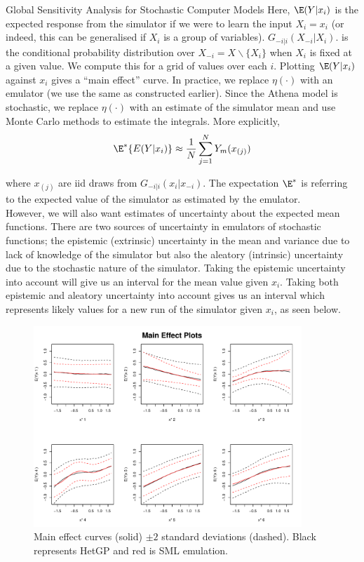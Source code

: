 \begin{chapter}{Global Sensitivity Analysis for Stochastic Computer Models}
Here, $\E(Y | x_i)$ is the expected response from the simulator if we were to learn the input $X_i = x_i$ (or indeed, this can be generalised if $X_i$ is a group of variables). $G_{-i|i}(X_{-i} | X_i)$. is the conditional probability distribution over $X_{-i} = X \backslash \{X_i\}$ when $X_i$ is fixed at a given value. We compute this for a grid of values over each $i$. Plotting $\E(Y | x_i)$ against $x_i$ gives a ``main effect'' curve. In practice, we replace $\eta(\cdot)$ with an emulator (we use the same as constructed earlier). Since the Athena model is stochastic, we replace $\eta(\cdot)$ with an estimate of the simulator mean and use Monte Carlo methods to estimate the integrals. More explicitly,
\begin{equation}
	\E^* \{ E(Y|x_i)\} \approx \frac{1}{N}\sum_{j=1}^N Y_m(x_{(j)})
\end{equation}

where $x_{(j)}$ are iid draws from $G_{-i|i}(x_i | x_{-i})$. The expectation $\E^*$ is referring to the expected value of the simulator as estimated by the emulator.
\\

However, we will also want estimates of uncertainty about the expected mean functions. There are two sources of uncertainty in emulators of stochastic functions; the epistemic (extrinsic) uncertainty in the mean and variance due to lack of knowledge of the simulator but also the aleatory (intrinsic) uncertainty due to the stochastic nature of the simulator. Taking the epistemic uncertainty into account will give us an interval for the mean value given $x_i$. Taking both epistemic and aleatory uncertainty into account gives us an interval which represents likely values for a new run of the simulator given $x_i$, as seen below.\\

\begin{figure}
	\centering
	\includegraphics[width = 0.9\textwidth]{fig-sa/main-effects.pdf}
	\caption{Main effect curves (solid) $\pm 2$ standard deviations (dashed). Black represents HetGP and red is SML emulation.}
	\label{Fig:main-effect}
\end{figure}


\end{chapter}

